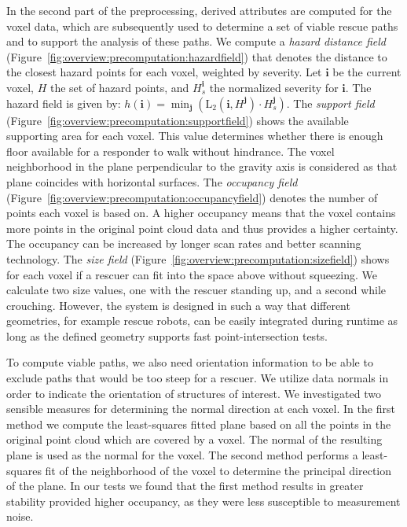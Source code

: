 \documentclass[conference,10pt,letter]{IEEEtran}
\begin{document}
 In the second part of the preprocessing, derived attributes are computed for the voxel data, which are subsequently used to determine a set of viable rescue paths and to support the analysis of these paths. We compute a \emph{hazard distance field} (Figure~\ref{fig:overview:precomputation:hazardfield}) that denotes the distance to the closest hazard points for each voxel, weighted by severity. Let $\mathbf{i}$ be the current voxel, $H$ the set of hazard points, and $H^{\mathbf{i}}_s$ the normalized severity for $\mathbf{i}$. The hazard field is given by: $h(\mathbf{i}) = \min_\mathbf{j}(\mathrm{L}_2(\mathbf{i}, H^\mathbf{j}) \cdot H^\mathbf{j}_s)$. The \emph{support field} (Figure~\ref{fig:overview:precomputation:supportfield}) shows the available supporting area for each voxel. This value determines whether there is enough floor available for a responder to walk without hindrance. The voxel neighborhood in the plane perpendicular to the gravity axis is considered as that plane coincides with horizontal surfaces. The \emph{occupancy field} (Figure~\ref{fig:overview:precomputation:occupancyfield}) denotes the number of  points each voxel is based on. A higher occupancy means that the voxel contains more points in the original point cloud data and thus provides a higher certainty. The occupancy can be increased by longer scan rates and better scanning technology. The \emph{size field} (Figure~\ref{fig:overview:precomputation:sizefield}) shows for each voxel if a rescuer can fit into the space above without squeezing. We calculate two size values, one with the rescuer standing up, and a second while crouching. However, the system is designed in such a way that different geometries, for example rescue robots, can be easily integrated during runtime as long as the defined geometry supports fast point-intersection tests. 

To compute viable paths, we also need orientation information to be able to exclude paths that would be too steep for a rescuer. We utilize data normals in order to indicate the orientation of structures of interest. We investigated two sensible measures for determining the normal direction at each voxel. In the first method we compute the least-squares fitted plane based on all the points in the original point cloud which are covered by a voxel. The normal of the resulting plane is used as the normal for the voxel. The second method performs a least-squares fit of the neighborhood of the voxel to determine the principal direction of the plane. In our tests we found that the first method results in greater stability provided higher occupancy, as they were less susceptible to measurement noise.
\end{document}
